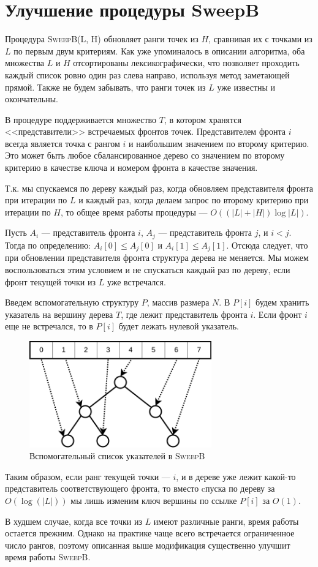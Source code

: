 \section{Улучшение процедуры SweepB}
Процедура \textsc{SweepB(L, H)} обновляет ранги точек из $H$, сравнивая их с точками из $L$ по первым двум критериям.
Как уже упоминалось в описании алгоритма, оба множества $L$ и $H$ отсортированы лексикографически, что позволяет проходить каждый список ровно один раз слева направо, используя метод заметающей прямой.
Также не будем забывать, что ранги точек из $L$ уже известны и окончательны.

В процедуре поддерживается множество $T$, в котором хранятся <<представители>> встречаемых фронтов точек. Представителем фронта $i$ всегда является точка с рангом $i$ и наибольшим значением по второму критерию. 
Это может быть любое сбалансированное дерево со значением по второму критерию в качестве ключа и номером фронта в качестве значения.

Т.к. мы спускаемся по дереву каждый раз, когда обновляем представителя фронта при итерации по $L$ и каждый раз, когда делаем запрос по второму критерию при итерации по $H$, то общее время работы процедуры --- $O((|L|+|H|)\log{|L|})$.

Пусть $A_i$ --- представитель фронта $i$, $A_j$ --- представитель фронта $j$, и $i < j$.
Тогда по определению: $A_i[0] \leq A_j[0]$ и $A_i[1] \leq A_j[1]$.
Отсюда следует, что при обновлении представителя фронта структура дерева не меняется.
Мы можем воспользоваться этим условием и не спускаться каждый раз по дереву, если фронт текущей точки из $L$ уже встречался.

Введем вспомогательную структуру $P$, массив размера $N$.
В $P[i]$ будем хранить указатель на вершину дерева $T$, где лежит представитель фронта $i$.
Если фронт $i$ еще не встречался, то в $P[i]$ будет лежать нулевой указатель.

\begin{figure}[h]
\centering
\includegraphics[width=0.7\textwidth]{images/sweep.png}
    \caption{Вспомогательный список указателей в \textsc{SweepB}}
\end{figure}

Таким образом, если ранг текущей точки --- $i$, и в дереве уже лежит какой-то представитель соответствующего фронта, то вместо cпуска по дереву за $O(\log(|L|))$ мы лишь изменим ключ вершины по ссылке $P[i]$ за $O(1)$.

В худшем случае, когда все точки из $L$ имеют различные ранги, время работы остается прежним.
Однако на практике чаще всего встречается ограниченное число рангов, поэтому описанная выше модификация существенно улучшит время работы \textsc{SweepB}.

